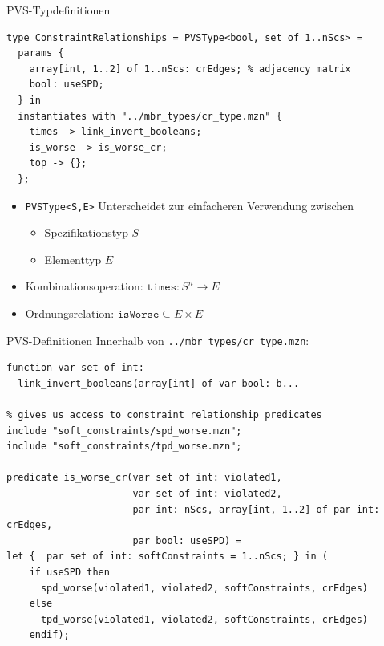 \begin{frame}[fragile]{PVS-Typdefinitionen}
\begin{lstlisting}
type ConstraintRelationships = PVSType<bool, set of 1..nScs> = 
  params { 
    array[int, 1..2] of 1..nScs: crEdges; % adjacency matrix
    bool: useSPD;
  } in 
  instantiates with "../mbr_types/cr_type.mzn" {
    times -> link_invert_booleans;
    is_worse -> is_worse_cr;
    top -> {};
  };
\end{lstlisting}
\begin{itemize}
\item \texttt{PVSType<S,E>} Unterscheidet zur einfacheren Verwendung zwischen 
\begin{itemize}
\item[] Spezifikationstyp $S$ 
\item[] Elementtyp $E$
\end{itemize} 
\item Kombinationsoperation: $\mathtt{times} : S^n \to E$
\item Ordnungsrelation: $\mathtt{isWorse} \subseteq E \times E$
\end{itemize}
\end{frame}

\begin{frame}[fragile]{PVS-Definitionen}
Innerhalb von \texttt{../mbr\_types/cr\_type.mzn}:
\begin{lstlisting}
function var set of int: 
  link_invert_booleans(array[int] of var bool: b...

% gives us access to constraint relationship predicates 
include "soft_constraints/spd_worse.mzn";
include "soft_constraints/tpd_worse.mzn";

predicate is_worse_cr(var set of int: violated1, 
                      var set of int: violated2,
                      par int: nScs, array[int, 1..2] of par int: crEdges, 
                      par bool: useSPD) =
let {  par set of int: softConstraints = 1..nScs; } in (                    
    if useSPD then
      spd_worse(violated1, violated2, softConstraints, crEdges)
    else
      tpd_worse(violated1, violated2, softConstraints, crEdges)
    endif);

\end{lstlisting}
\end{frame}

